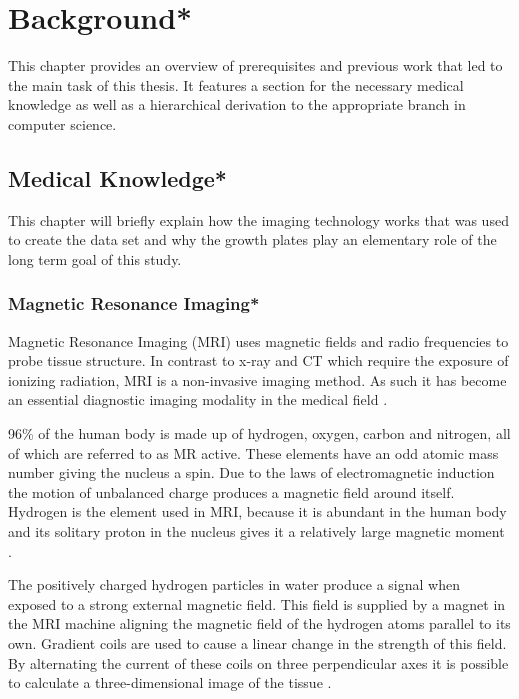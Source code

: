 \section{Background*}

This chapter provides an overview of prerequisites and previous work that led to the main task of this thesis. It features a section for the necessary medical knowledge as well as a hierarchical derivation to the appropriate branch in computer science.

\subsection{Medical Knowledge*}

This chapter will briefly explain how the imaging technology works that was used to create the data set and why the growth plates play an elementary role of the long term goal of this study.

\subsubsection{Magnetic Resonance Imaging*}

Magnetic Resonance Imaging (MRI) uses magnetic fields and radio frequencies to probe tissue structure. In contrast to x-ray and CT which require the exposure of ionizing radiation, MRI is a non-invasive imaging method. As such it has become an essential diagnostic imaging modality in the medical field \cite{Westbrook2016}.

96\% of the human body is made up of hydrogen, oxygen, carbon and nitrogen, all of which are referred to as MR active. These elements have an odd atomic mass number giving the nucleus a spin. Due to the laws of electromagnetic induction the motion of unbalanced charge produces a magnetic field around itself. Hydrogen is the element used in MRI, because it is abundant in the human body and its solitary proton in the nucleus gives it a relatively large magnetic moment \cite{Westbrook2016}. 

The positively charged hydrogen particles in water produce a signal when exposed to a strong external magnetic field. This field is supplied by a magnet in the MRI machine aligning the magnetic field of the hydrogen atoms parallel to its own. Gradient coils are used to cause a linear change in the strength of this field. By alternating the current of these coils on three perpendicular axes it is possible to calculate a three-dimensional image of the tissue \cite{Westbrook2016}.

